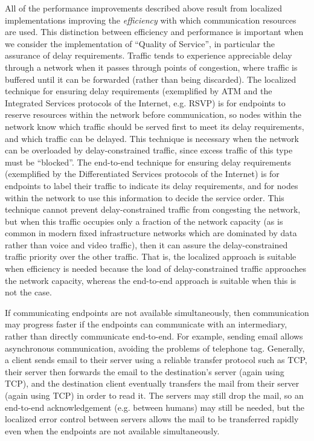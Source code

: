 \documentclass[a4paper,11pt,notitlepage,twoside,openright]{article}
\begin{document}
All of the performance improvements described above result from
localized implementations improving the \emph{efficiency} with which
communication resources are used. This distinction between efficiency
and performance is important when we consider the implementation of
``Quality of Service'', in particular the assurance of delay
requirements. Traffic tends to experience appreciable delay through a
network when it passes through points of congestion, where traffic is
buffered until it can be forwarded (rather than being discarded). The
localized technique for ensuring delay requirements (exemplified by ATM
and the Integrated Services protocols of the Internet, e.g. RSVP) is for
endpoints to reserve resources within the network before communication,
so nodes within the network know which traffic should be served first to
meet its delay requirements, and which traffic can be delayed. This
technique is necessary when the network can be overloaded by
delay-constrained traffic, since excess traffic of this type must be
``blocked''. The end-to-end technique for ensuring delay requirements
(exemplified by the Differentiated Services protocols of the Internet)
is for endpoints to label their traffic to indicate its delay
requirements, and for nodes within the network to use this information
to decide the service order. This technique cannot prevent
delay-constrained traffic from congesting the network, but when this
traffic occupies only a fraction of the network capacity (as is common
in modern fixed infrastructure networks which are dominated by data
rather than voice and video traffic), then it can assure the
delay-constrained traffic priority over the other traffic. That is, the
localized approach is suitable when efficiency is needed because the
load of delay-constrained traffic approaches the network capacity,
whereas the end-to-end approach is suitable when this is not the case.

If communicating endpoints are not available simultaneously, then
communication may progress faster if the endpoints can communicate with
an intermediary, rather than directly communicate end-to-end. For
example, sending email allows asynchronous communication, avoiding the
problems of telephone tag. Generally, a client sends email to their
server using a reliable transfer protocol such as TCP, their server then
forwards the email to the destination's server (again using TCP), and
the destination client eventually transfers the mail from their server
(again using TCP) in order to read it. The servers may still drop the
mail, so an end-to-end acknowledgement (e.g. between humans) may still
be needed, but the localized error control between servers allows the
mail to be transferred rapidly even when the endpoints are not available
simultaneously.
\end{document}
